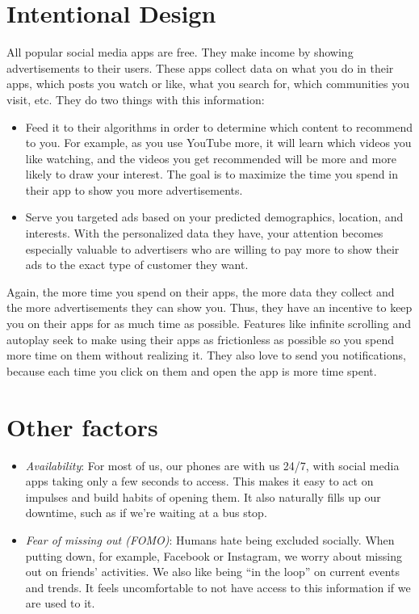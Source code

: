 \documentclass[
  openany]{book}
\providecommand{\tightlist}{%
  \setlength{\itemsep}{0pt}\setlength{\parskip}{0pt}}
\begin{document}
\section{Intentional Design}\label{intentional-design}

All popular social media apps are free. They make income by showing advertisements to their users. These apps collect data on what you do in their apps, which posts you watch or like, what you search for, which communities you visit, etc. They do two things with this information:

\begin{itemize}
\tightlist
\item
  Feed it to their algorithms in order to determine which content to recommend to you. For example, as you use YouTube more, it will learn which videos you like watching, and the videos you get recommended will be more and more likely to draw your interest. The goal is to maximize the time you spend in their app to show you more advertisements.
\item
  Serve you targeted ads based on your predicted demographics, location, and interests. With the personalized data they have, your attention becomes especially valuable to advertisers who are willing to pay more to show their ads to the exact type of customer they want.
\end{itemize}

Again, the more time you spend on their apps, the more data they collect and the more advertisements they can show you. Thus, they have an incentive to keep you on their apps for as much time as possible. Features like infinite scrolling and autoplay seek to make using their apps as frictionless as possible so you spend more time on them without realizing it. They also love to send you notifications, because each time you click on them and open the app is more time spent.

\section{Other factors}\label{other-factors}

\begin{itemize}
\tightlist
\item
  \emph{Availability}: For most of us, our phones are with us 24/7, with social media apps taking only a few seconds to access. This makes it easy to act on impulses and build habits of opening them. It also naturally fills up our downtime, such as if we're waiting at a bus stop.
\item
  \emph{Fear of missing out (FOMO)}: Humans hate being excluded socially. When putting down, for example, Facebook or Instagram, we worry about missing out on friends' activities. We also like being ``in the loop'' on current events and trends. It feels uncomfortable to not have access to this information if we are used to it.
\end{itemize}
\end{document}
